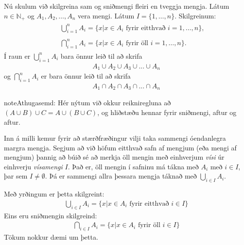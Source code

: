 \documentclass[a4paper,10pt,icelandic]{sphinxmanual}
\begin{document}
Nú skulum við skilgreina sam\sphinxhyphen{} og sniðmengi fleiri en tveggja mengja.
Látum \(n \in \mathbb{N_+}\) og \(A_1,A_2,\dots,A_n\) vera mengi. Látum \(I = \{1, \dots, n \}\). Skilgreinum:
\begin{equation*}
\begin{split}\begin{aligned}
& \bigcup_{i=1}^n A_i=\{x|x\in A_i \text{ fyrir eitthvað } i = 1, \dots, n \}, \\
\quad\\
& \bigcap_{i=1}^n A_i=\{x|x\in A_i \text{ fyrir öll }  i = 1, \dots, n\}.
\end{aligned}\end{split}
\end{equation*}
Í raun er \(\bigcup_{i=1}^n A_i\) bara önnur leið til að skrifa
\begin{equation*}
\begin{split}A_1\cup A_2\cup A_3\cup...\cup A_n\end{split}
\end{equation*}
og \(\bigcap_{i=1}^n A_i\) er bara önnur leið til að skrifa
\begin{equation*}
\begin{split}A_1\cap A_2\cap A_3\cap...\cap A_n\end{split}
\end{equation*}
\begin{sphinxadmonition}{note}{Athugasemd:}
Hér nýtum við okkur reikniregluna að \(\left(A\cup B\right)\cup C=A\cup\left(B\cup C\right)\), og hliðstæðu hennar fyrir sniðmengi, aftur og aftur.
\end{sphinxadmonition}

Inn á milli kemur fyrir að stærðfræðingur vilji taka sammengi óendanlegra margra mengja. Segjum að við höfum eitthvað safn af mengjum (eða mengi af mengjum) þannig að búið sé að merkja öll mengin með einhverjum \textit{vísi} úr einhverju \textit{vísamengi} \(I\). Það er, öll mengin í safninu má tákna með \(A_i\) með \(i\in I\), þar sem \(I \neq \emptyset\). Þá er sammengi allra þessara mengja táknað með \(\bigcup_{i\in I}A_i\).

Með yrðingum er þetta skilgreint:
\begin{equation*}
\begin{split}\bigcup_{i\in I}A_i=\{x|x\in A_i \text{ fyrir eitthvað } i\in I \}\end{split}
\end{equation*}
Eins eru sniðmengin skilgreind:
\begin{equation*}
\begin{split}\bigcap_{i\in I}A_i=\{x|x\in A_i \text{ fyrir öll } i\in I \}\end{split}
\end{equation*}
Tökum nokkur dæmi um þetta.
\end{document}
